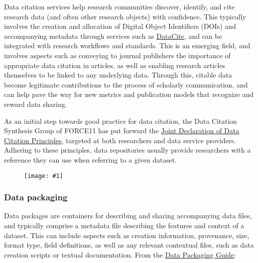 \documentclass{article}
\newlength{\imgwidth}
\newcommand\scaledgraphics[2]{%
                
\settowidth{\imgwidth}{\texttt{[image: \#1]}}%
                
\setlength{\imgwidth}{\minof{\imgwidth}{#2\textwidth}}%
                
\texttt{[image: \#1]}%
                
}
\begin{document}
Data citation services help research communities discover, identify, and cite research data (and often other research objects) with confidence. This typically involves the creation and allocation of Digital Object Identifiers (DOIs) and accompanying metadata through services such as \href{https://www.datacite.org/}{DataCite}, and can be integrated with research workflows and standards. This is an emerging field, and involves aspects such as conveying to journal publishers the importance of appropriate data citation in articles, as well as enabling research articles themselves to be linked to any underlying data. Through this, citable data become legitimate contributions to the process of scholarly communication, and can help pave the way for new metrics and publication models that recognize and reward data sharing.


As an initial step towards good practice for data citation, the Data Citation Synthesis Group of FORCE11 has put forward the \href{https://doi.org/10.25490/a97f-egyk}{Joint Declaration of Data Citation Principles}, targeted at both researchers and data service providers. Adhering to these principles, data repositories usually provide researchers with a reference they can use when referring to a given dataset.

\begin{figure}
\scaledgraphics{13ef0ff8-44c6-48dc-b70d-d470dac3a90b.png}{1}
\label{F82447091}
\end{figure}


\subsubsection{\textbf{Data packaging}}\label{data-packaging}



Data packages are containers for describing and sharing accompanying data files, and typically comprise a metadata file describing the features and context of a dataset. This can include aspects such as creation information, provenance, size, format type, field definitions, as well as any relevant contextual files, such as data creation scripts or textual documentation. From the \href{https://github.com/saverkamp/beyond-open-data/blob/master/DataGuide.md}{Data Packaging Guide}:
\end{document}
